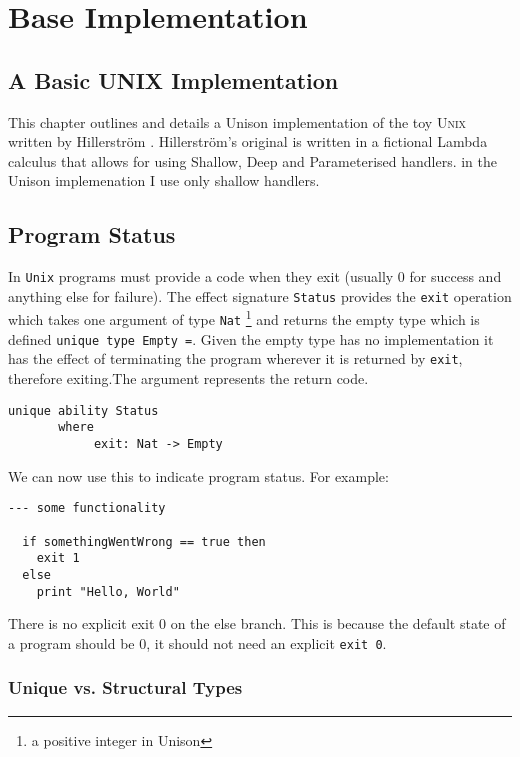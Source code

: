 \documentclass[logo,bsc,singlespacing,parskip]{infthesis}
\begin{document}
\chapter{Base Implementation}
\label{baseimplementation}

\section{A Basic UNIX Implementation}

This chapter outlines and details a Unison implementation of the toy
\textsc{Unix} written by Hillerstr\"{o}m \cite{hillerstrom2022foundations}.
Hillerstr\"{o}m's original is written in a fictional Lambda calculus that allows
for using Shallow, Deep and Parameterised handlers. in the Unison implemenation
I use only shallow handlers.

\section{Program Status}
\label{status}

In \texttt{Unix} programs must provide a code when they exit (usually 0 for
success and anything else for failure). The effect signature \texttt{Status}
provides the \texttt{exit} operation which takes one argument of type
\texttt{Nat} \footnote{a positive integer in Unison} and returns the empty type
which is defined \texttt{unique type Empty =}. Given the empty type has no
implementation it has the effect of terminating the program wherever it is
returned by \texttt{exit}, therefore exiting.The argument represents the return
code.

\begin{lstlisting}[language=unison]
unique ability Status
       where
            exit: Nat -> Empty
\end{lstlisting}

We can now use this to indicate program status. For example:

\begin{lstlisting}[language=unison]
  --- some functionality 

  if somethingWentWrong == true then
    exit 1
  else
    print "Hello, World"
\end{lstlisting}

There is no explicit exit 0 on the else branch. This is because the default
state of a program should be 0, it should not need an explicit \texttt{exit 0}.

\subsection{Unique vs. Structural Types}
\end{document}
